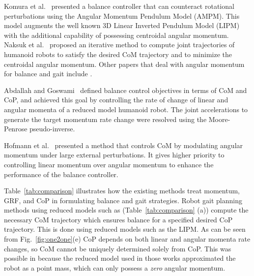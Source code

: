 \documentclass{llncs}
\begin{document}
Komura et al.~\cite{KLKK05} presented a balance controller that can counteract
rotational perturbations using the Angular Momentum Pendulum Model (AMPM).
This model augments the well known 3D Linear
Inverted Pendulum Model (LIPM)~\cite{KKKYH01} with the additional capability of possessing
centroidal angular momentum.
Naksuk et al.~\cite{Naksuk04} proposed an iterative method
to compute joint trajectories of humanoid robots to satisfy the desired CoM trajectory
and to minimize the centroidal angular momentum.
Other papers that deal with angular momentum for balance
and gait include \cite{Sian03,Ahn06,Ugurlu10,Ye10,Lasa10}.

Abdallah and Goswami~\cite{AG05} defined balance control objectives
in terms of CoM and CoP, and achieved this goal by controlling
the rate of change of linear and angular momenta of a reduced model
humanoid robot. The joint accelerations to generate the target
momentum rate change were resolved using the Moore-Penrose pseudo-inverse.

Hofmann et al.~\cite{Hofmann09} presented a method that
controls CoM by modulating angular momentum under large
external perturbations. It gives higher priority to controlling
linear momentum over angular momentum to enhance the performance
of the balance controller.



Table~\ref{tab:comparison} illustrates how the existing methods treat momentum,
GRF, and CoP in formulating balance and gait strategies.
Robot gait planning methods using reduced models such
as \cite{KKKYH01,Choi07} (Table~\ref{tab:comparison} (a))
compute the necessary CoM trajectory which ensures balance
for a specified desired CoP trajectory.
This is done using reduced models such as the LIPM.
As can be seen from Fig.~\ref{fig:one2one}(e) CoP depends  on both
linear and angular momenta rate changes, so
CoM cannot be uniquely determined solely from CoP.
This was possible in \cite{KKKYH01,Choi07} because the reduced model used in those works
approximated the robot as a point mass, which
can only possess a {\it zero} angular momentum.
\end{document}
